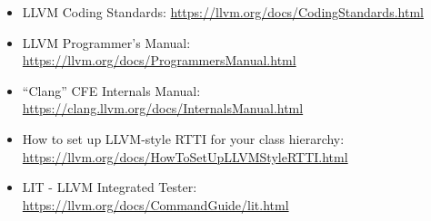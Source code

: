 \begin{itemize}
\item
LLVM Coding Standards: \url{https://llvm.org/docs/CodingStandards.html}

\item
LLVM Programmer’s Manual: \url{https://llvm.org/docs/ProgrammersManual.html}

\item
“Clang” CFE Internals Manual: \url{https://clang.llvm.org/docs/InternalsManual.html}

\item
How to set up LLVM-style RTTI for your class hierarchy: \url{https://llvm.org/docs/HowToSetUpLLVMStyleRTTI.html}

\item
LIT - LLVM Integrated Tester: \url{https://llvm.org/docs/CommandGuide/lit.html}
\end{itemize}